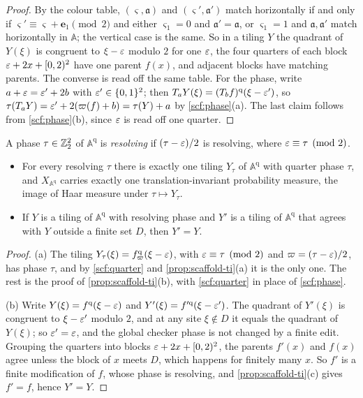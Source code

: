 \begin{proof}
By the colour table, $(\varsigma,\mathfrak a)$ and $(\varsigma',\mathfrak a')$ match horizontally if and only if $\varsigma'\equiv\varsigma+\mathbf e_1\pmod2$ and either $\varsigma_1=0$ and $\mathfrak a'=\mathfrak a$, or $\varsigma_1=1$ and $\mathfrak a,\mathfrak a'$ match horizontally in $\mathbb A$; the vertical case is the same. So in a tiling $Y$ the quadrant of $Y(\xi)$ is congruent to $\xi-\varepsilon$ modulo $2$ for one $\varepsilon$, the four quarters of each block $\varepsilon+2x+[0,2)^2$ have one parent $f(x)$, and adjacent blocks have matching parents. The converse is read off the same table. For the phase, write $a+\varepsilon=\varepsilon'+2b$ with $\varepsilon'\in\{0,1\}^2$; then $T_aY(\xi)=(T_bf)^{\mathrm q}(\xi-\varepsilon')$, so $\tau(T_aY)=\varepsilon'+2(\varpi(f)+b)=\tau(Y)+a$ by \cref{scf:phase}(a). The last claim follows from \cref{scf:phase}(b), since $\varepsilon$ is read off one quarter.
\end{proof}

A phase $\tau\in\mathbb{Z}_2^2$ of $\mathbb A^{\mathrm q}$ is \emph{resolving} if $(\tau-\varepsilon)/2$ is resolving, where $\varepsilon\equiv\tau\pmod2$.

\begin{proposition}\label{prop:quarter-ti}
\begin{itemize}
\item[(a)] For every resolving $\tau$ there is exactly one tiling $Y_\tau$ of $\mathbb A^{\mathrm q}$ with quarter phase $\tau$, and $X_{\mathbb A^{\mathrm q}}$ carries exactly one translation-invariant probability measure, the image of Haar measure under $\tau\mapsto Y_\tau$.
\item[(b)] If $Y$ is a tiling of $\mathbb A^{\mathrm q}$ with resolving phase and $Y'$ is a tiling of $\mathbb A^{\mathrm q}$ that agrees with $Y$ outside a finite set $D$, then $Y'=Y$.
\end{itemize}
\end{proposition}

\begin{proof}
(a) The tiling $Y_\tau(\xi)=f_{\varpi}^{\mathrm q}(\xi-\varepsilon)$, with $\varepsilon\equiv\tau\pmod 2$ and $\varpi=(\tau-\varepsilon)/2$, has phase $\tau$, and by \cref{scf:quarter} and \cref{prop:scaffold-ti}(a) it is the only one. The rest is the proof of \cref{prop:scaffold-ti}(b), with \cref{scf:quarter} in place of \cref{scf:phase}.

(b) Write $Y(\xi)=f^{\mathrm q}(\xi-\varepsilon)$ and $Y'(\xi)=f'^{\mathrm q}(\xi-\varepsilon')$. The quadrant of $Y'(\xi)$ is congruent to $\xi-\varepsilon'$ modulo $2$, and at any site $\xi\notin D$ it equals the quadrant of $Y(\xi)$; so $\varepsilon'=\varepsilon$, and the global checker phase is not changed by a finite edit. Grouping the quarters into blocks $\varepsilon+2x+[0,2)^2$, the parents $f'(x)$ and $f(x)$ agree unless the block of $x$ meets $D$, which happens for finitely many $x$. So $f'$ is a finite modification of $f$, whose phase is resolving, and \cref{prop:scaffold-ti}(c) gives $f'=f$, hence $Y'=Y$.
\end{proof}

